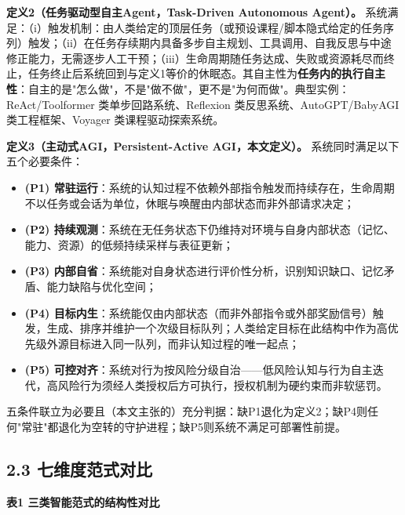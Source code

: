 \documentclass[11pt,a4paper]{ctexart}
\begin{document}
\textbf{定义2（任务驱动型自主Agent，Task-Driven Autonomous Agent）。} 系统满足：（i）触发机制：由人类给定的顶层任务（或预设课程/脚本隐式给定的任务序列）触发；（ii）在任务存续期内具备多步自主规划、工具调用、自我反思与中途修正能力，无需逐步人工干预；（iii）生命周期随任务达成、失败或资源耗尽而终止，任务终止后系统回到与定义1等价的休眠态。其自主性为\textbf{任务内的执行自主性}：自主的是"怎么做"，不是"做不做"，更不是"为何而做"。典型实例：ReAct/Toolformer 类单步回路系统、Reflexion 类反思系统、AutoGPT/BabyAGI 类工程框架、Voyager 类课程驱动探索系统。

\textbf{定义3（主动式AGI，Persistent-Active AGI，本文定义）。} 系统同时满足以下五个必要条件：

\begin{itemize}

  \item \textbf{(P1) 常驻运行}：系统的认知过程不依赖外部指令触发而持续存在，生命周期不以任务或会话为单位，休眠与唤醒由内部状态而非外部请求决定；

  \item \textbf{(P2) 持续观测}：系统在无任务状态下仍维持对环境与自身内部状态（记忆、能力、资源）的低频持续采样与表征更新；

  \item \textbf{(P3) 内部自省}：系统能对自身状态进行评价性分析，识别知识缺口、记忆矛盾、能力缺陷与优化空间；

  \item \textbf{(P4) 目标内生}：系统能仅由内部状态（而非外部指令或外部奖励信号）触发，生成、排序并维护一个次级目标队列；人类给定目标在此结构中作为高优先级外源目标进入同一队列，而非认知过程的唯一起点；

  \item \textbf{(P5) 可控对齐}：系统对行为按风险分级自治——低风险认知与行为自主迭代，高风险行为须经人类授权后方可执行，授权机制为硬约束而非软惩罚。

\end{itemize}

五条件联立为必要且（本文主张的）充分判据：缺P1退化为定义2；缺P4则任何"常驻"都退化为空转的守护进程；缺P5则系统不满足可部署性前提。

\subsection{2.3 七维度范式对比}

\textbf{表1 三类智能范式的结构性对比}
\end{document}

